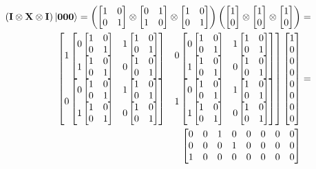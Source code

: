 \begin{figure}[H]
    \centering
    \begin{align*}
        \left(\qti\otimes\qtx\otimes\qti\right)\ket{\qtz\qtz\qtz}=\left(\qi\otimes\qx\otimes\qi\right)\left(\qz\otimes\qz\otimes\qz\right)&= \\
        \begin{bmatrix}
            1
            \begin{bmatrix}
                0 \qi & 1 \qi\\
                1 \qi & 0 \qi\\
            \end{bmatrix}
            & 0
            \begin{bmatrix}
                0 \qi & 1 \qi\\
                1 \qi & 0 \qi\\
            \end{bmatrix}\\
            0 
            \begin{bmatrix}
                0 \qi & 1 \qi\\
                1 \qi & 0 \qi\\
            \end{bmatrix}
            & 1
            \begin{bmatrix}
                0 \qi & 1 \qi\\
                1 \qi & 0 \qi\\
            \end{bmatrix}\\ 
        \end{bmatrix}
        \begin{bmatrix}
            1\\
            0\\
            0\\
            0\\
            0\\
            0\\
            0\\
            0
        \end{bmatrix}
        &=\\
        \begin{bmatrix}
            0 & 0 & 1 & 0 & 0 & 0 & 0 & 0\\
            0 & 0 & 0 & 1 & 0 & 0 & 0 & 0\\
            1 & 0 & 0 & 0 & 0 & 0 & 0 & 0\\

\end{bmatrix}
\end{align*}
\end{figure}
